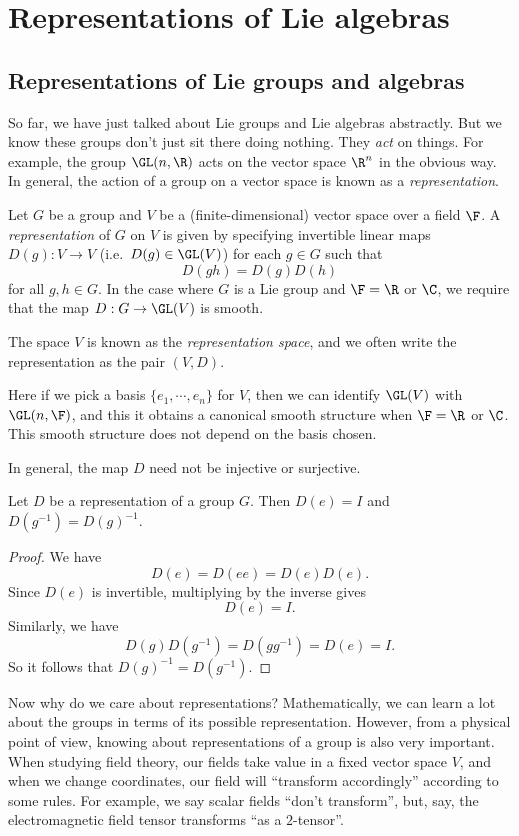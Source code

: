 \documentclass[a4paper]{article}
\begin{document}
\section{Representations of Lie algebras}
\subsection{Representations of Lie groups and algebras}
So far, we have just talked about Lie groups and Lie algebras abstractly. But we know these groups don't just sit there doing nothing. They \emph{act} on things. For example, the group $\GL(n,\R)$ acts on the vector space $\R^n$ in the obvious way. In general, the action of a group on a vector space is known as a \emph{representation}.

\begin{defi}
  Let $G$ be a group and $V$ be a (finite-dimensional) vector space over a field $\F$. A \emph{representation} of $G$ on $V$ is given by specifying invertible linear maps $D(g): V \to V$ (i.e.\ $D(g) \in \GL(V)$) for each $g \in G$ such that
  \[
    D(gh) = D(g)D(h)
  \]
  for all $g, h \in G$. In the case where $G$ is a Lie group and $\F = \R$ or $\C$, we require that the map $D: G \to \GL(V)$ is smooth.

  The space $V$ is known as the \emph{representation space}, and we often write the representation as the pair $(V, D)$.
\end{defi}
Here if we pick a basis $\{e_1, \cdots, e_n\}$ for $V$, then we can identify $\GL(V)$ with $\GL(n, \F)$, and this it obtains a canonical smooth structure when $\F = \R$ or $\C$. This smooth structure does not depend on the basis chosen.

In general, the map $D$ need not be injective or surjective.

\begin{prop}
  Let $D$ be a representation of a group $G$. Then $D(e) = I$ and $D(g^{-1}) = D(g)^{-1}$.
\end{prop}

\begin{proof}
  We have
  \[
    D(e) = D(ee) = D(e) D(e).
  \]
  Since $D(e)$ is invertible, multiplying by the inverse gives
  \[
    D(e) = I.
  \]
  Similarly, we have
  \[
    D(g) D(g^{-1}) = D(gg^{-1})= D(e) = I.
  \]
  So it follows that $D(g)^{-1} = D(g^{-1})$.
\end{proof}

Now why do we care about representations? Mathematically, we can learn a lot about the groups in terms of its possible representation. However, from a physical point of view, knowing about representations of a group is also very important. When studying field theory, our fields take value in a fixed vector space $V$, and when we change coordinates, our field will ``transform accordingly'' according to some rules. For example, we say scalar fields ``don't transform'', but, say, the electromagnetic field tensor transforms ``as a $2$-tensor''.
\end{document}
